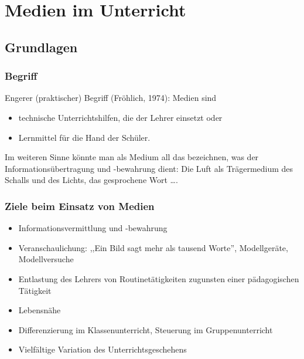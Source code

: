 \chapter{Medien im Unterricht}\label{Medien}

\section{Grundlagen}
\subsection{Begriff}
Engerer (praktischer) Begriff (Fr\"{o}hlich, 1974): Medien sind
\begin{itemize}
\item
technische Unterrichtshilfen, die der Lehrer einsetzt oder
\item
Lernmittel f\"{u}r die Hand der Sch\"{u}ler.
\end{itemize}

Im weiteren Sinne k\"{o}nnte man als Medium all das bezeichnen, was der
Informations\"{u}bertragung und -bewahrung dient:
Die Luft als Tr\"{a}germedium
des Schalls und des Lichts, das gesprochene Wort \dots.

\subsection{Ziele beim Einsatz von Medien}
\begin{itemize}
\item
Informationsvermittlung und -bewahrung
\item
Veranschaulichung: ,,Ein Bild sagt mehr als tausend Worte'',
Modellger\"{a}te, Modellversuche
\item
Entlastung des Lehrers von Routine\-t\"{a}tigkeiten zugunsten einer
p\"{a}dagogischen T\"{a}tigkeit
\item
Lebensn\"{a}he
\item
Differenzierung im Klassenunterricht, Steuerung
im Gruppenunterricht
\item
Vielf\"{a}ltige Variation des Unterrichtsgeschehens
\end{itemize}

